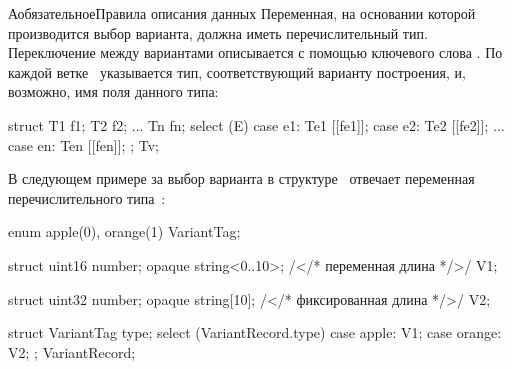 \begin{appendix}{А}{обязательное}{Правила описания данных}
Переменная, на основании которой производится выбор варианта, должна иметь
перечислительный тип. Переключение между вариантами описывается с помощью 
ключевого слова . По каждой ветке~ указывается 
тип, соответствующий варианту построения, и, возможно, имя поля данного типа:
%
\begin{codeblock}
struct {
  T1 f1;
  T2 f2;
  ...
  Tn fn;
  select (E) {
    case e1: Te1 [[fe1]];
    case e2: Te2 [[fe2]];
    ...
    case en: Ten [[fen]];
  };
} Tv;
\end{codeblock}

В следующем примере за выбор варианта в структуре~
отвечает переменная перечислительного типа~:
%
\begin{codeblock}
enum { apple(0), orange(1) } VariantTag;

struct {
  uint16 number;
  opaque string<0..10>;   /</* переменная длина */>/
} V1;

struct {
  uint32 number;
  opaque string[10];      /</* фиксированная длина */>/
} V2;

struct {
  VariantTag type;
  select (VariantRecord.type) {
    case apple:  V1;
    case orange: V2;
  };
} VariantRecord;
\end{codeblock}

\end{appendix}
